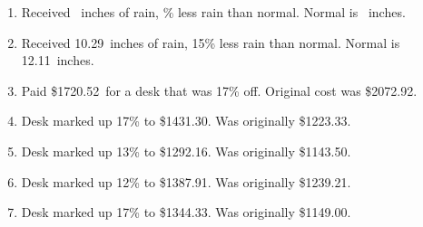 \documentclass[12pt]{amsart}
\begin{document}
\begin{enumerate}
\item Received \rainy\ inches of rain, \discount\% less rain than normal. Normal is \orrainy\ inches.
\def \discount{15}\def \paid{1238.05}\def \rainy{10.29}\def \orcost{1456.53}\def \purcost{1076.57}\def \orrainy{12.11}
\item Received \rainy\ inches of rain, \discount\% less rain than normal. Normal is \orrainy\ inches.
\def \discount{17}\def \paid{1720.52}\def \rainy{8.60}\def \orcost{2072.92}\def \purcost{1470.53}\def \orrainy{10.36}
\item Paid \$\paid\ for a desk that was \discount\% off. Original cost was \$\orcost. 
\def \discount{17}\def \paid{1431.30}\def \rainy{10.53}\def \orcost{1724.46}\def \purcost{1223.33}\def \orrainy{12.69}
\item Desk marked up \discount\% to \$\paid. Was originally \$\purcost. 
\def \discount{13}\def \paid{1292.16}\def \rainy{8.90}\def \orcost{1485.24}\def \purcost{1143.50}\def \orrainy{10.23}
\item Desk marked up \discount\% to \$\paid. Was originally \$\purcost. 
\def \discount{12}\def \paid{1387.91}\def \rainy{14.13}\def \orcost{1577.17}\def \purcost{1239.21}\def \orrainy{16.06}
\item Desk marked up \discount\% to \$\paid. Was originally \$\purcost. 
\def \discount{17}\def \paid{1344.33}\def \rainy{11.79}\def \orcost{1619.67}\def \purcost{1149.00}\def \orrainy{14.20}
\item Desk marked up \discount\% to \$\paid. Was originally \$\purcost. 
\end{enumerate} 
\end{document}
